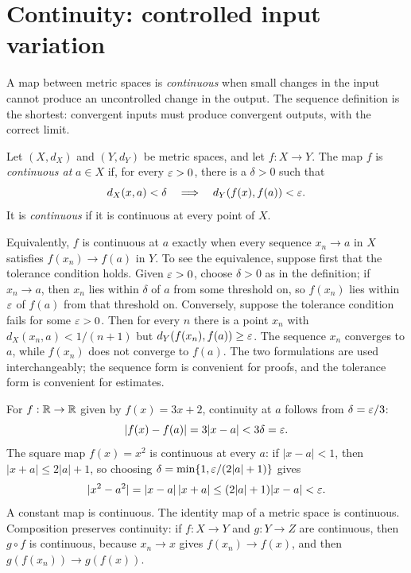 \section{Continuity: controlled input variation}\label{ch11:sec:continuity}
A map between metric spaces is \emph{continuous} when small changes in the input cannot produce an uncontrolled change in the output. The sequence definition is the shortest: convergent inputs must produce convergent outputs, with the correct limit.

\par\noindent\begin{minipage}{\linewidth}
\begin{definition}[Continuity]\label{ch11:def:continuity}
Let $(X,d_X)$ and $(Y,d_Y)$ be metric spaces, and let $f:X\to Y$. The map $f$ is \emph{continuous at} $a\in X$ if, for every $\varepsilon>0$, there is a $\delta>0$ such that
\[
d_X(x,a)<\delta\quad\Longrightarrow\quad d_Y(f(x),f(a))<\varepsilon.
\]
It is \emph{continuous} if it is continuous at every point of $X$.
\end{definition}
\end{minipage}\par

Equivalently, $f$ is continuous at $a$ exactly when every sequence $x_n\to a$ in $X$ satisfies $f(x_n)\to f(a)$ in $Y$. To see the equivalence, suppose first that the tolerance condition holds. Given $\varepsilon>0$, choose $\delta>0$ as in the definition; if $x_n\to a$, then $x_n$ lies within $\delta$ of $a$ from some threshold on, so $f(x_n)$ lies within $\varepsilon$ of $f(a)$ from that threshold on. Conversely, suppose the tolerance condition fails for some $\varepsilon>0$. Then for every $n$ there is a point $x_n$ with $d_X(x_n,a)<1/(n+1)$ but $d_Y(f(x_n),f(a))\ge\varepsilon$. The sequence $x_n$ converges to $a$, while $f(x_n)$ does not converge to $f(a)$. The two formulations are used interchangeably; the sequence form is convenient for proofs, and the tolerance form is convenient for estimates.

For $f:\mathbb R\to\mathbb R$ given by $f(x)=3x+2$, continuity at $a$ follows from $\delta=\varepsilon/3$:
\[
|f(x)-f(a)|=3|x-a|<3\delta=\varepsilon.
\]
The square map $f(x)=x^2$ is continuous at every $a$: if $|x-a|<1$, then $|x+a|\le2|a|+1$, so choosing $\delta=\min\{1,\varepsilon/(2|a|+1)\}$ gives
\[
|x^2-a^2|=|x-a|\,|x+a|\le(2|a|+1)|x-a|<\varepsilon.
\]
A constant map is continuous. The identity map of a metric space is continuous. Composition preserves continuity: if $f:X\to Y$ and $g:Y\to Z$ are continuous, then $g\circ f$ is continuous, because $x_n\to x$ gives $f(x_n)\to f(x)$, and then $g(f(x_n))\to g(f(x))$.

